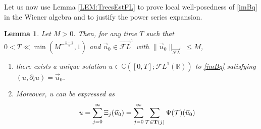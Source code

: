 \documentclass[letterpaper, 11pt,  reqno]{amsart}
\newtheorem{lemma}[theorem]{Lemma}
\newcommand{\1}{\hspace{0.5mm}\text{I}\hspace{0.5mm}}
\newcommand{\R}{\mathbb{R}}
\newcommand{\C}{\mathbb{C}}
\newcommand{\TT}{\mathcal{T}}
\newcommand{\BT}{{\bf T}}%
\newcommand{\FL}{\mathcal{F}L} %
\newcommand{\FLv}{\overrightarrow{\mathcal{F}L}}
\newcommand{\dt}{\partial_t}
\numberwithin{equation}{section}
\numberwithin{theorem}{section}
\begin{document}
Let us now use Lemma \ref{LEM:TreesEstFL} to prove local well-posedness of \eqref{imBq} in the Wiener algebra and to justify the power series expansion.

\begin{lemma}
\label{LEM:ExistenceOfSolution}
Let $M > 0$. Then, for any time $T$ such that $0 < T \ll \min(M^{-\frac{k-1}{2} }, 1)$ and $\vec{u}_0 \in \FLv^1$ with $\| \vec{u}_0 \|_{\FLv^1} \leq M$, 
\begin{enumerate}
	\item there exists a unique solution $u \in \C ([0,T]; \FL^1 (\R))$ to \eqref{imBq} satisfying $(u, \dt u) = \vec{u}_0$.
	\item Moreover, u can be expressed as
\begin{equation}
\label{EQ:PowerSeriesSol}
u = \sum_{j = 0}^\infty \Xi_j (\vec{u}_0) = \sum_{j = 0}^\infty \sum_{\TT \in \BT (j)} \Psi(\TT)(\vec{u}_0)
\end{equation}
\end{enumerate}

\end{lemma}
\end{document}
